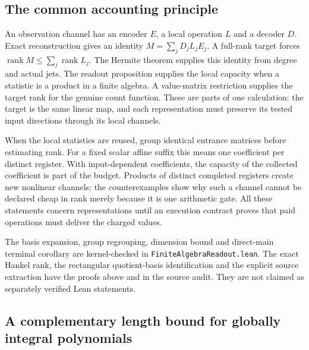 \documentclass[
  11pt,
]{article}
\begin{document}
\subsection{The common accounting
principle}\label{the-common-accounting-principle}

An observation channel has an encoder \(E\), a local operation \(L\) and
a decoder \(D\). Exact reconstruction gives an identity
\(M=\sum_jD_jL_jE_j\). A full-rank target forces
\(\operatorname{rank}M\le\sum_j\operatorname{rank}L_j\). The Hermite
theorem supplies this identity from degree and actual jets. The readout
proposition supplies the local capacity when a statistic is a product in
a finite algebra. A value-matrix restriction supplies the target rank
for the genuine count function. These are parts of one calculation: the
target is the same linear map, and each representation must preserve its
tested input directions through its local channels.

When the local statistics are reused, group identical entrance matrices
before estimating rank. For a fixed scalar affine suffix this means one
coefficient per distinct register. With input-dependent coefficients,
the capacity of the collected coefficient is part of the budget.
Products of distinct completed registers create new nonlinear channels;
the counterexamples show why such a channel cannot be declared cheap in
rank merely because it is one arithmetic gate. All these statements
concern representations until an execution contract proves that paid
operations must deliver the charged values.

The basis expansion, group regrouping, dimension bound and direct-main
terminal corollary are kernel-checked in
\nolinkurl{FiniteAlgebraReadout.lean}. The exact Hankel rank, the
rectangular quotient-basis identification and the explicit source
extraction have the proofs above and in the source audit. They are not
claimed as separately verified Lean statements.

\subsection{A complementary length bound for globally integral
polynomials}\label{a-complementary-length-bound-for-globally-integral-polynomials}
\end{document}
